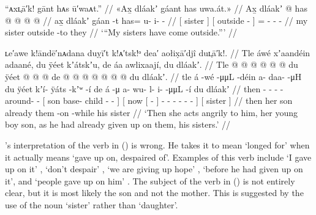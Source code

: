 \ex\label{ex:92-177-my-sisters-outside}%
%
\begingl
	\glpreamble	“ᴀxʟ̣ā′k! gānt hᴀs ū′waᴀt.” //
	\glpreamble	«\!Ax̱ dláakʼ gáant has uwa.át.\!» //
	\gla	{} Ax̱ dláakʼ {}
		{}  @ {} {}
		has @  @ {} @ {} @ {} //
	\glb	{} ax̱ dláakʼ {}
		{} gáan -t {}
		has= u- i-  - //
	\glc	{}[  sister {}]
		{}[ outside - {}]
		= - -  - //
	\gld	{} my sister {}
		{} outside -to {}
		they  {} {} {} //
	\glft	‘“My sisters have come outside.”’
		//
\endgl
\xe

\ex\label{ex:92-178-angry-son-sisters-given-up}%
%
\begingl
	\glpreamble	ʟe′awe k!āndē′nᴀdana duỵī′t k!ᴀ′tsk!ᵒ dea′ aołix̣ā′djî duʟ̣ā′k!. //
	\glpreamble	Tle áwé xʼaandéin adaané, du ÿéet kʼátskʼu, de áa awlixaají, du dláakʼ. //
	\gla	Tle  @ {}
		 @ {} @ {}
		 @ {} @ {} @ {}
		{} du ÿéet  @ {} @ {} @ {} {}
		{} de {}  @ {} {}
			 @ {} @ {} @ {} @ {} @ {} @ {} {}
		{} du dláakʼ. {} //
	\glb	tle á -wé
		 -μμL -déin
		a- daa-  -μH
		{} du ÿéet kʼí- ÿáts -kʼʷ -í {}
		{} de {} á -μ {}
			a- wu- l- i-  -μμL -í {}
		{} du dláakʼ {} //
	\glc	then  -
		 - -
		- around-  -
		{}[  son base- child - - {}]
		{}[ now {}[  - {}]
			- - - -
			 - - {}]
		{}[  sister {}] //
	\gld	then  {}
		 {} {}
		 {} {} {}
		{} her son  {} {} {} {}
		{} already {} them -on {}
			 {} {} {} {} {} -while {}
		{} his sister {} //
	\glft	‘Then she acts angrily to him, her young boy son, as he had already given up on them, his sisters.’
		//
\endgl
\xe

\citeauthor{swanton:1909}’s interpretation of the verb  in (\lastx) is wrong.
He takes it to mean ‘longed for’ when it actually means ‘gave up on, despaired of’.
Examples of this verb include  ‘I gave up on it’ \parencite[163.2239]{story-naish:1973},  ‘don’t despair’ \parencite[67.786]{story-naish:1973},  ‘we are giving up hope’ \parencite[67.787]{story-naish:1973},  ‘before he had given up on it’, and  ‘people gave up on him’ \parencite[both][f03/26]{leer:1973}.
The subject of the verb in (\lastx) is not entirely clear, but it is most likely the son and not the mother.
This is suggested by the use of the noun  ‘sister’ rather than  ‘daughter’.

